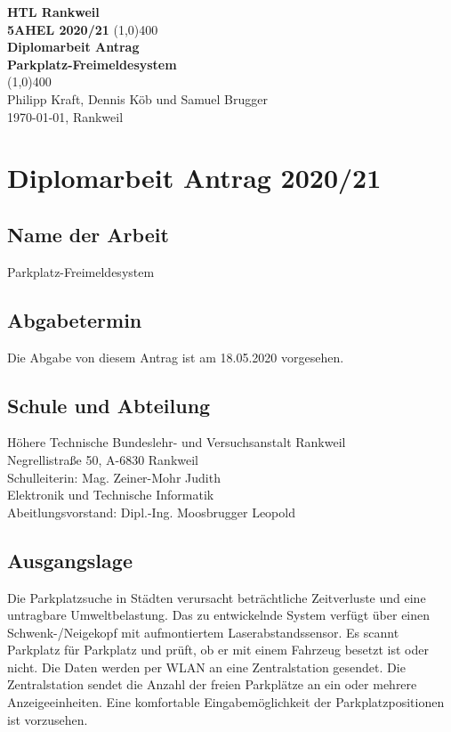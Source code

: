 \documentclass[11pt]{article}
\begin{document}
\begin{titlepage}
  \begin{center}
    \vspace*{1cm}
    \large{\textbf{HTL Rankweil}}\\
    \large{\textbf{5AHEL 2020/21}}
    \vfill
    \line(1,0){400}\\[1mm]
    \huge{\textbf{Diplomarbeit Antrag}}\\[3mm]
    \large{\textbf{Parkplatz-Freimeldesystem}}\\[1mm]
    \line(1,0){400}\\
    \vfill
    Philipp Kraft, Dennis Köb und Samuel Brugger\\[3mm]
    \today, Rankweil
  \end{center}
\end{titlepage}

\tableofcontents
\thispagestyle{empty}
\clearpage

\setcounter{page}{1}
\section{Diplomarbeit Antrag 2020/21}

\subsection{Name der Arbeit}
Parkplatz-Freimeldesystem

\subsection{Abgabetermin}
Die Abgabe von diesem Antrag ist am 18.05.2020 vorgesehen.

\subsection{Schule und Abteilung}
Höhere Technische Bundeslehr- und Versuchsanstalt Rankweil\\
Negrellistraße 50, A-6830 Rankweil\\
Schulleiterin: Mag. Zeiner-Mohr Judith\\

Elektronik und Technische Informatik\\
Abeitlungsvorstand: Dipl.-Ing. Moosbrugger Leopold

\subsection{Ausgangslage}
Die Parkplatzsuche in Städten verursacht beträchtliche Zeitverluste und eine untragbare Umweltbelastung. Das zu entwickelnde System verfügt über einen Schwenk-/Neigekopf mit aufmontiertem Laserabstandssensor. Es scannt Parkplatz für Parkplatz und prüft, ob er mit einem Fahrzeug besetzt ist oder nicht. Die Daten werden per WLAN an eine Zentralstation gesendet. Die Zentralstation sendet die Anzahl der freien Parkplätze an ein oder mehrere Anzeigeeinheiten. Eine komfortable Eingabemöglichkeit der Parkplatzpositionen ist vorzusehen.
\end{document}
